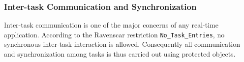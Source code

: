 \subsubsection{Inter-task Communication and Synchronization}
\label{sec:comm_sync}
Inter-task communication is one of the major concerns of any real-time
application. According to the Ravenscar restriction
\texttt{No\_Task\_Entries}, no synchronous inter-task interaction is
allowed. Consequently all communication and synchronization among
tasks is thus carried out using protected objects.

